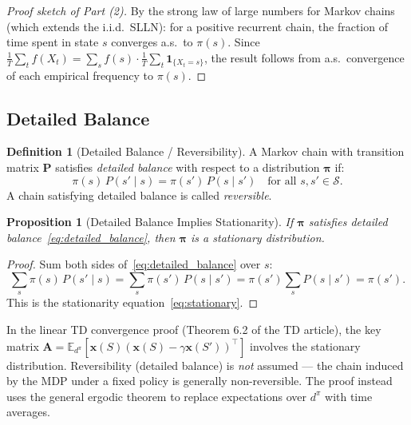 \documentclass[11pt,a4paper]{article}
\theoremstyle{definition}
\newtheorem{definition}{Definition}[section]
\theoremstyle{plain}
\newtheorem{proposition}[theorem]{Proposition}
\theoremstyle{remark}
\newcommand{\E}{\mathbb{E}}
\newcommand{\indicator}{\mathbf{1}}
\begin{document}
\begin{proof}[Proof sketch of Part (2)]
By the strong law of large numbers for Markov chains (which extends the i.i.d.\ SLLN): for a positive recurrent chain, the fraction of time spent in state $s$ converges a.s.\ to $\pi(s)$. Since $\frac{1}{T}\sum_t f(X_t) = \sum_s f(s) \cdot \frac{1}{T}\sum_t \indicator_{\{X_t = s\}}$, the result follows from a.s.\ convergence of each empirical frequency to $\pi(s)$.
\end{proof}

\subsection{Detailed Balance}
\label{subsec:detailed_balance}

\begin{definition}[Detailed Balance / Reversibility]
\label{def:detailed_balance}
A Markov chain with transition matrix $\mathbf{P}$ satisfies \emph{detailed balance} with respect to a distribution $\boldsymbol{\pi}$ if:
\begin{equation}
    \pi(s)\, P(s' \mid s) = \pi(s')\, P(s \mid s') \quad \text{for all } s, s' \in \mathcal{S}.
    \label{eq:detailed_balance}
\end{equation}
A chain satisfying detailed balance is called \emph{reversible}.
\end{definition}

\begin{proposition}[Detailed Balance Implies Stationarity]
\label{prop:db_stationary}
If $\boldsymbol{\pi}$ satisfies detailed balance~\eqref{eq:detailed_balance}, then $\boldsymbol{\pi}$ is a stationary distribution.
\end{proposition}

\begin{proof}
Sum both sides of~\eqref{eq:detailed_balance} over $s$:
\begin{equation}
    \sum_s \pi(s)\, P(s' \mid s) = \sum_s \pi(s')\, P(s \mid s') = \pi(s') \sum_s P(s \mid s') = \pi(s').
\end{equation}
This is the stationarity equation~\eqref{eq:stationary}.
\end{proof}

\begin{rlconnection}[Connection to RL]
In the linear TD convergence proof (Theorem 6.2 of the TD article), the key matrix $\mathbf{A} = \E_{d^\pi}[\mathbf{x}(S)(\mathbf{x}(S) - \gamma \mathbf{x}(S'))^\top]$ involves the stationary distribution. Reversibility (detailed balance) is \emph{not} assumed --- the chain induced by the MDP under a fixed policy is generally non-reversible. The proof instead uses the general ergodic theorem to replace expectations over $d^\pi$ with time averages.
\end{rlconnection}
\end{document}
